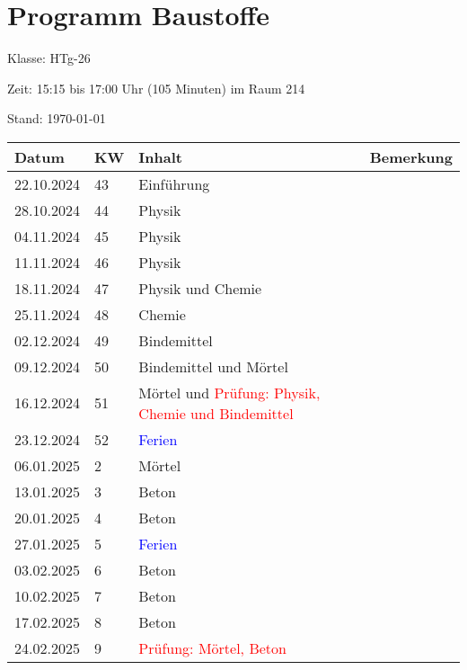 \documentclass[
11pt,
captions=tableheading,
headings=big,
headsepline,
footsepline, 
captions=tableheading,
parskip=half-,
]{scrartcl}
\title{\fach}
\date{2024}
\newcommand{\klasse}{HTg-26\xspace}
\newcommand{\red}[1]{\textcolor{red}{#1}}
\begin{document}
\section*{Programm Baustoffe}

Klasse: \klasse

Zeit: 15:15 bis 17:00 Uhr (105 Minuten) im Raum 214



Stand: \today

\vspace{1cm}



\begin{table}[H]
    \centering
    \begin{tabular}{llp{8cm}p{4cm}}
    \toprule
    \textbf{Datum} & \textbf{KW}  & \textbf{Inhalt} & \textbf{Bemerkung} \\
    \midrule
        22.10.2024 & 43 & Einführung & {} \\
        28.10.2024 & 44 & Physik& {} \\
        04.11.2024 & 45 & Physik & {} \\
        11.11.2024 & 46 & Physik & {} \\
        18.11.2024 & 47 & Physik und Chemie & {} \\
        25.11.2024 & 48 & Chemie & {} \\
        02.12.2024 & 49 & Bindemittel& {} \\
        09.12.2024 & 50 & Bindemittel und Mörtel & {} \\
        16.12.2024 & 51 & Mörtel und \red{Prüfung: Physik, Chemie und Bindemittel} & {} \\
        \midrule
        23.12.2024 & 52 & \textcolor{blue}{Ferien} \\
        \midrule
        06.01.2025 & 2 & Mörtel & {} \\
        13.01.2025 & 3 & Beton & {} \\
        20.01.2025 & 4 & Beton & {} \\
        \midrule
        27.01.2025 & 5 & \textcolor{blue}{Ferien} & {} \\
        \midrule
        03.02.2025 & 6 & Beton& {} \\
        10.02.2025 & 7 & Beton& {} \\
        17.02.2025 & 8 & Beton & {} \\
        24.02.2025 & 9 & \red{Prüfung: Mörtel, Beton}& {}\\
    \bottomrule
    \end{tabular}
\end{table}
\end{document}
